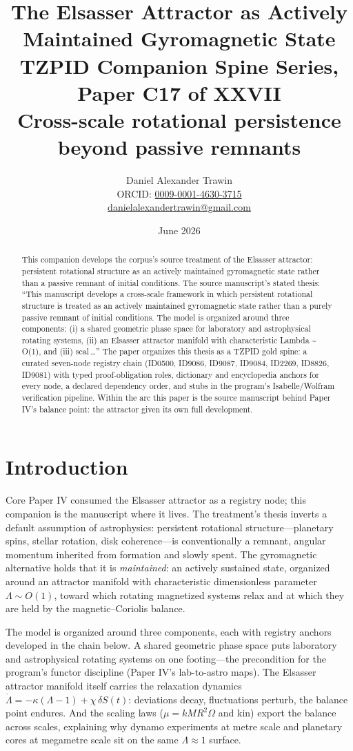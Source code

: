 \documentclass[11pt]{article}
\title{The Elsasser Attractor as Actively Maintained Gyromagnetic State\\[0.6em]
\large TZPID Companion Spine Series, Paper C17 of XXVII\\
\normalsize Cross-scale rotational persistence beyond passive remnants}
\author{Daniel Alexander Trawin\\
\small ORCID: \href{https://orcid.org/0009-0001-4630-3715}{0009-0001-4630-3715}\\
\small \href{mailto:danielalexandertrawin@gmail.com}{danielalexandertrawin@gmail.com}}
\date{June 2026}
\theoremstyle{remark}
\begin{document}
\maketitle

\begin{abstract}
This companion develops the corpus's source treatment of the Elsasser attractor: persistent rotational structure as an actively maintained gyromagnetic state rather than a passive remnant of initial conditions.
The source manuscript's stated thesis: ``This manuscript develops a cross-scale framework in which persistent rotational structure is treated as an actively maintained gyromagnetic state rather than a purely passive remnant of initial conditions. The model is organized around three components: (i) a shared geometric phase space for laboratory and astrophysical rotating systems, (ii) an Elsasser attractor manifold with characteristic Lambda \textasciitilde{} O(1), and (iii) scal\,\ldots'' The paper organizes this thesis as a TZPID gold spine: a curated seven-node registry chain (ID0500, ID9086, ID9087, ID9084, ID2269, ID8826, ID9081) with typed proof-obligation roles, dictionary and encyclopedia anchors for every node, a declared dependency order, and stubs in the program's Isabelle/Wolfram verification pipeline. Within the arc this paper is the source manuscript behind Paper IV's balance point: the attractor given its own full development.
\end{abstract}

\section{Introduction}
\label{sec:intro}

Core Paper IV consumed the Elsasser attractor as a registry node; this companion is the manuscript where it lives. The treatment's thesis inverts a default assumption of astrophysics: persistent rotational structure---planetary spins, stellar rotation, disk coherence---is conventionally a remnant, angular momentum inherited from formation and slowly spent. The gyromagnetic alternative holds that it is \emph{maintained}: an actively sustained state, organized around an attractor manifold with characteristic dimensionless parameter $\Lambda \sim O(1)$, toward which rotating magnetized systems relax and at which they are held by the magnetic--Coriolis balance.

The model is organized around three components, each with registry anchors developed in the chain below. A shared geometric phase space puts laboratory and astrophysical rotating systems on one footing---the precondition for the program's functor discipline (Paper IV's lab-to-astro maps). The Elsasser attractor manifold itself carries the relaxation dynamics $\dot{\Lambda} = -\kappa(\Lambda - 1) + \chi\,\delta S(t)$: deviations decay, fluctuations perturb, the balance point endures. And the scaling laws ($\mu = kMR^2\Omega$ and kin) export the balance across scales, explaining why dynamo experiments at metre scale and planetary cores at megametre scale sit on the same $\Lambda \approx 1$ surface.
\end{document}
